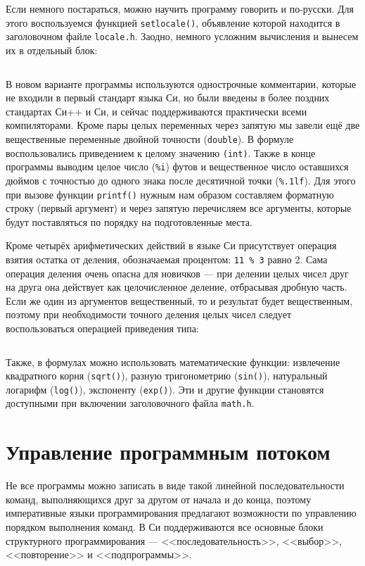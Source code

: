 Если немного постараться, можно научить программу говорить и по-русски. Для
этого воспользуемся функцией \texttt{setlocale()}, объявление которой
находится в заголовочном файле \texttt{locale.h}. Заодно, немного усложним
вычисления и вынесем их в отдельный блок:
%
\inputminted{c}{samples/feet_rus.c}

В новом варианте программы используются однострочные комментарии, которые не
входили в первый стандарт языка Си, но были введены в более поздних стандартах
Си++ и Си, и сейчас поддерживаются практически всеми компиляторами.
Кроме пары целых переменных через запятую мы завели ещё две вещественные
переменные двойной точности (\texttt{double}). В формуле воспользовались
приведением к целому значению \verb|(int)|. Также в конце программы выводим
целое число (\verb|%i|) футов и вещественное число оставшихся дюймов с
точностью до одного знака после десятичной точки (\verb|%.1lf|). Для этого при
вызове функции \texttt{printf()} нужным нам образом составляем форматную
строку (первый аргумент) и через запятую перечисляем все аргументы, которые
будут поставляться по порядку на подготовленные места.

Кроме четырёх арифметических действий в языке Си присутствует операция взятия
остатка от деления, обозначаемая процентом: \texttt{11 \% 3} равно 2.
Сама операция деления очень опасна для новичков --- при делении целых чисел
друг на друга она действует как целочисленное деление, отбрасывая дробную часть.
Если же один из аргументов вещественный, то и результат будет вещественным, поэтому
при необходимости точного деления целых чисел следует воспользоваться операцией
приведения типа:
%
\inputminted{c}{samples/equation.c}

Также, в формулах можно использовать математические функции: извлечение
квадратного корня (\texttt{sqrt()}), разную тригонометрию (\texttt{sin()}),
натуральный логарифм (\texttt{log()}), экспоненту (\texttt{exp()}). Эти и
другие функции становятся доступными при включении заголовочного файла
\texttt{math.h}.


\section{Управление программным потоком}

Не все программы можно записать в виде такой линейной последовательности
команд, выполняющихся друг за другом от начала и до конца, поэтому
императивные языки программирования предлагают возможности по управлению
порядком выполнения команд. В Си поддерживаются все основные блоки
структурного программирования --- <<последовательность>>, <<выбор>>,
<<повторение>> и <<подпрограммы>>.

